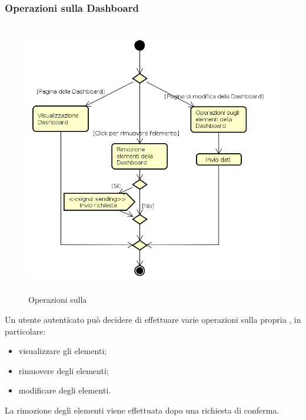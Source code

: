 \subsubsection{Operazioni sulla Dashboard}
\begin{figure}[H]
\begin{center}
\includegraphics[height=12cm]{res/sections/backend/activities/operazioniDashboard.png}
\caption{Operazioni sulla }
\end{center}
\end{figure}
Un utente autenticato può decidere di effettuare varie operazioni sulla propria , in particolare:
\begin{itemize}
\item visualizzare gli elementi;
\item rimuovere degli elementi;
\item modificare degli elementi.
\end{itemize}
La rimozione degli elementi viene effettuata dopo una richiesta di conferma.
\newpage

